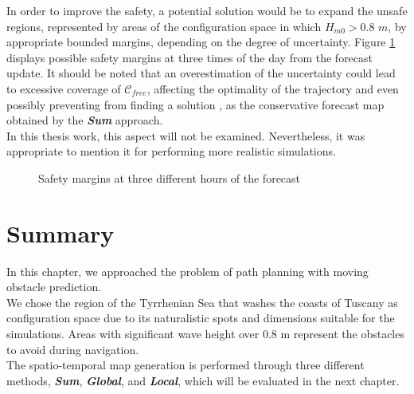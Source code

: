 In order to improve the safety, a potential solution would be to expand the unsafe regions, represented by areas of the configuration space in which $H_{m0} > 0.8$ $m$, by appropriate bounded margins, depending on the degree of uncertainty. Figure \ref{safmargin} displays possible safety margins at three times of the day from the forecast update.
It should be noted that an overestimation of the uncertainty could lead to excessive coverage of $\mathcal{C}_{free}$, affecting the optimality of the trajectory and even possibly preventing from finding a solution \cite{mothes2019trajectory}, as the conservative forecast map obtained by the \textbf{\textit{Sum}} approach.\\
In this thesis work, this aspect will not be examined. Nevertheless, it was appropriate to mention it for performing more realistic simulations.
\vspace{0.5cm}
\begin{figure}[h]
	\centering 
	\hspace{0.1cm}
	\hspace{0.1cm}
	\vspace{0.0cm}
	\caption{Safety margins at three different hours of the forecast} 
	\label{safmargin}
\end{figure}
\newpage
\section{Summary}
In this chapter, we approached the problem of path planning with moving obstacle prediction.\\
We chose the region of the Tyrrhenian Sea that washes the coasts of Tuscany as configuration space due to its naturalistic spots and dimensions suitable for the simulations. Areas with significant wave height over 0.8 m represent the obstacles to avoid during navigation. \\
The spatio-temporal map generation is performed through three different methods, \textbf{\textit{Sum}}, \textbf{\textit{Global}}, and \textbf{\textit{Local}}, which will be evaluated in the next chapter.

